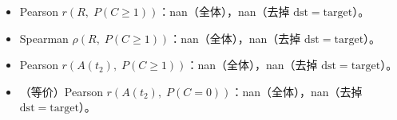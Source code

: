 \begin{itemize}
  \item Pearson $r(R,\;P(C\ge1))$：nan（全体），nan（去掉 $\mathrm{dst}=\mathrm{target}$）。
  \item Spearman $\rho(R,\;P(C\ge1))$：nan（全体），nan（去掉 $\mathrm{dst}=\mathrm{target}$）。
  \item Pearson $r(A(t_2),\;P(C\ge1))$：nan（全体），nan（去掉 $\mathrm{dst}=\mathrm{target}$）。
  \item （等价）Pearson $r(A(t_2),\;P(C=0))$：nan（全体），nan（去掉 $\mathrm{dst}=\mathrm{target}$）。

\end{itemize}
